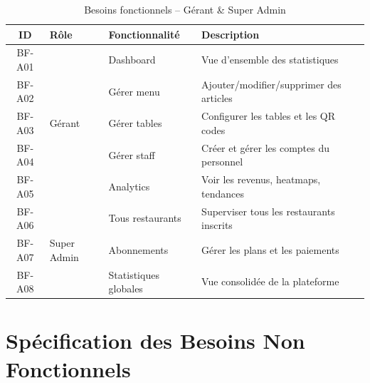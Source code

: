 \documentclass[12pt,a4paper]{report}
\begin{document}
\begin{table}[H]
    \centering
    \begin{tabularx}{\textwidth}{c l l X}
        \toprule
        \rowcolor{accent!10}
        \textbf{ID} & \textbf{Rôle} & \textbf{Fonctionnalité} & \textbf{Description} \\
        \midrule
        BF-A01 & \multirow{5}{*}{Gérant} & Dashboard & Vue d'ensemble des statistiques \\
        BF-A02 & & Gérer menu & Ajouter/modifier/supprimer des articles \\
        BF-A03 & & Gérer tables & Configurer les tables et les QR codes \\
        BF-A04 & & Gérer staff & Créer et gérer les comptes du personnel \\
        BF-A05 & & Analytics & Voir les revenus, heatmaps, tendances \\
        \midrule
        BF-A06 & \multirow{3}{*}{Super Admin} & Tous restaurants & Superviser tous les restaurants inscrits \\
        BF-A07 & & Abonnements & Gérer les plans et les paiements \\
        BF-A08 & & Statistiques globales & Vue consolidée de la plateforme \\
        \bottomrule
    \end{tabularx}
    \caption{Besoins fonctionnels -- Gérant \& Super Admin}
    \label{tab:bf-admin}
\end{table}

\section{Spécification des Besoins Non Fonctionnels}
\end{document}
